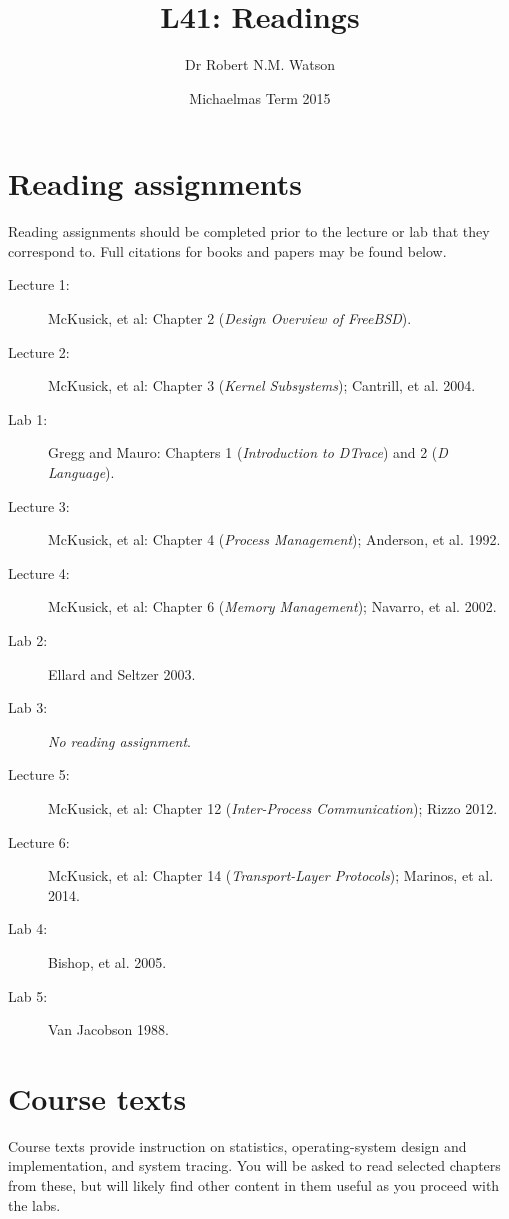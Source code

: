 \documentclass[a4paper,10pt]{article}
\begin{document}
\title{L41: Readings}
\author{Dr Robert N.M. Watson}
\date{Michaelmas Term 2015}
\maketitle

\section*{Reading assignments}
Reading assignments should be completed prior to the lecture or lab that they
correspond to.
Full citations for books and papers may be found below.

\begin{description}
\item[Lecture 1:] McKusick, et al: Chapter 2 (\textit{Design Overview of
  FreeBSD}).
\item[Lecture 2:] McKusick, et al: Chapter 3 (\textit{Kernel Subsystems});
  Cantrill, et al. 2004.
\item[Lab 1:] Gregg and Mauro: Chapters 1 (\textit{Introduction to DTrace}) and
  2 (\textit{D Language}).
\item[Lecture 3:] McKusick, et al: Chapter 4 (\textit{Process Management});
  Anderson, et al. 1992.
\item[Lecture 4:] McKusick, et al: Chapter 6 (\textit{Memory Management});
  Navarro, et al. 2002.
\item[Lab 2:] Ellard and Seltzer 2003.
\item[Lab 3:] \textit{No reading assignment}.
\item[Lecture 5:] McKusick, et al: Chapter 12 (\textit{Inter-Process
  Communication}); Rizzo 2012.
\item[Lecture 6:] McKusick, et al: Chapter 14 (\textit{Transport-Layer
  Protocols}); Marinos, et al. 2014.
\item[Lab 4:] Bishop, et al. 2005.
\item[Lab 5:] Van Jacobson 1988.
\end{description}

\section*{Course texts}
Course texts provide instruction on statistics, operating-system design and
implementation, and system tracing.
You will be asked to read selected chapters from these, but will likely find
other content in them useful as you proceed with the labs.
\end{document}
